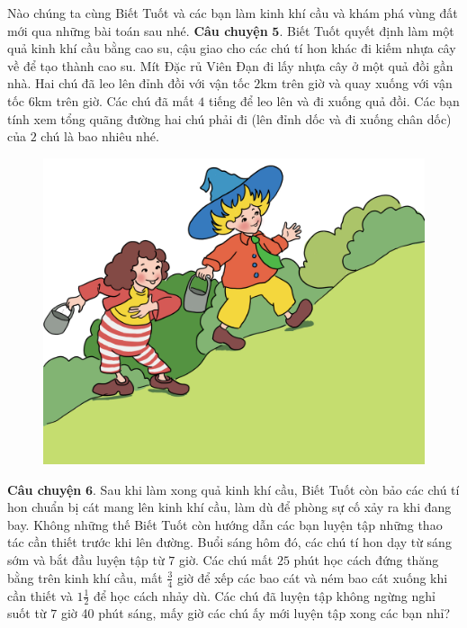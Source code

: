 	\vskip 0.1cm
	Nào chúng ta cùng Biết Tuốt và các bạn làm kinh khí cầu và khám phá vùng đất mới qua những bài toán sau nhé.
	\vskip 0.1cm
	\textbf{\color{toancuabi}Câu chuyện} $\pmb{5.}$ Biết Tuốt quyết định làm một quả kinh khí cầu bằng cao su, cậu giao cho các chú tí hon khác đi kiếm nhựa cây về để tạo thành cao su. Mít Đặc rủ Viên Đạn đi lấy nhựa cây ở một quả đồi gần nhà. Hai chú đã leo lên đỉnh đồi với vận tốc $2$km trên giờ và quay xuống với vận tốc $6$km trên giờ. Các chú đã mất $4$ tiếng để leo lên và đi xuống quả đồi. Các bạn tính xem tổng quãng đường hai chú phải đi (lên đỉnh dốc và đi xuống chân dốc) của $2$ chú là bao nhiêu nhé.
		\begin{figure}[H]
		\centering
		\vspace*{-5pt}
		\captionsetup{labelformat= empty, justification=centering}
		\includegraphics[width=0.5\linewidth]{Hinh8_LayNhua}
		\vspace*{-10pt}
	\end{figure}
	\textbf{\color{toancuabi}Câu chuyện} $\pmb{6.}$ Sau khi làm xong quả kinh khí cầu, Biết Tuốt còn bảo các chú tí hon chuẩn bị cát mang lên kinh khí cầu, làm dù để phòng sự cố xảy ra khi đang bay. Không những thế Biết Tuốt còn hướng dẫn các bạn luyện tập những thao tác cần thiết trước khi lên đường. Buổi sáng hôm đó, các chú tí hon dạy từ sáng sớm và bắt đầu luyện tập từ $7$ giờ. Các chú mất $25$ phút học cách đứng thăng bằng trên kinh khí cầu, mất $\frac{3}{4}$ giờ để xếp các bao cát và ném bao cát xuống khi cần thiết và $1\frac{1}{2}$ để học cách nhảy dù. Các chú đã luyện tập không ngừng nghỉ suốt từ $7$ giờ 40 phút sáng, mấy giờ các chú ấy mới luyện tập xong các bạn nhỉ?
